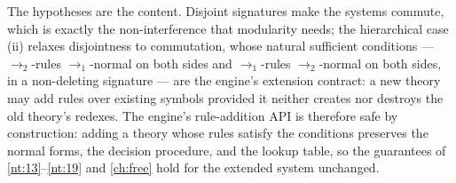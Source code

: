 \begin{remark}
The hypotheses are the content. Disjoint signatures make the systems
commute, which is exactly the non-interference that modularity needs;
the hierarchical case (ii) relaxes disjointness to commutation, whose
natural sufficient conditions --- $\to_2$-rules $\to_1$-normal on both
sides and $\to_1$-rules $\to_2$-normal on both sides, in a non-deleting
signature --- are the engine's extension contract: a new theory may add
rules over existing symbols provided it neither creates nor destroys the
old theory's redexes. The engine's rule-addition API is therefore safe
by construction: adding a theory whose rules satisfy the conditions
preserves the normal forms, the decision procedure, and the lookup
table, so the guarantees of \ref{nt:13}--\ref{nt:19} and
\autoref{ch:free} hold for the extended system unchanged.
\end{remark}
